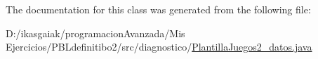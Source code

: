 The documentation for this class was generated from the following file\+:\begin{DoxyCompactItemize}
\item 
D\+:/ikasgaiak/programacion\+Avanzada/\+Mis Ejercicios/\+P\+B\+Ldefinitibo2/src/diagnostico/\mbox{\hyperlink{_plantilla_juegos2__datos_8java}{Plantilla\+Juegos2\+\_\+datos.\+java}}\end{DoxyCompactItemize}
